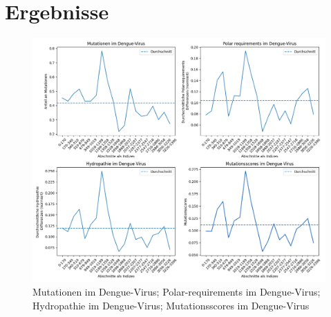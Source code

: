 \documentclass[german,version-2022-01]{uzl-thesis}
\begin{document}
\chapter{Ergebnisse}
\begin{figure}[tbp]
  \centering
  \includegraphics[scale=0.36]{Images/Diagramm_combined_pictures_Dengue_virus.png}
  \caption{Mutationen im Dengue-Virus; Polar-requirements im Dengue-Virus; Hydropathie im Dengue-Virus; Mutationsscores im Dengue-Virus}
  \label{fig:Dengue_virus_combined}
\end{figure}
\end{document}
